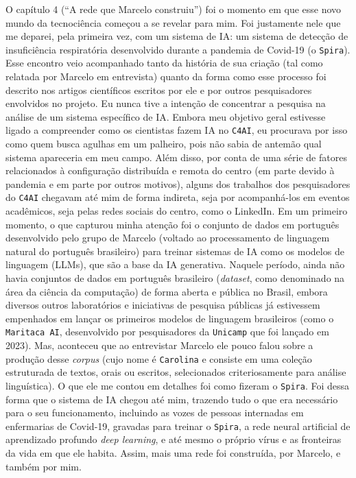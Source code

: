 O capítulo 4 (``A rede que Marcelo construiu'') foi o momento em que esse novo mundo da tecnociência começou a se revelar para mim. Foi justamente nele que me deparei, pela primeira vez, com um sistema de IA: um sistema de detecção de insuficiência respiratória desenvolvido durante a pandemia de Covid-19 (o \texttt{Spira}). Esse encontro veio acompanhado tanto da história de sua criação (tal como relatada por Marcelo em entrevista) quanto da forma como esse processo foi descrito nos artigos científicos escritos por ele e por outros pesquisadores envolvidos no projeto. Eu nunca tive a intenção de concentrar a pesquisa na análise de um sistema específico de IA. Embora meu objetivo geral estivesse ligado a compreender como os cientistas fazem IA no \texttt{C4AI}, eu procurava por isso como quem busca agulhas em um palheiro, pois não sabia de antemão qual sistema apareceria em meu campo. Além disso, por conta de uma série de fatores relacionados à configuração distribuída e remota do centro (em parte devido à pandemia e em parte por outros motivos), alguns dos trabalhos dos pesquisadores do \texttt{C4AI} chegavam até mim de forma indireta, seja por acompanhá-los em eventos acadêmicos, seja pelas redes sociais do centro, como o LinkedIn. Em um primeiro momento, o que capturou minha atenção foi o conjunto de dados em português desenvolvido pelo grupo de Marcelo (voltado ao processamento de linguagem natural do português brasileiro) para treinar sistemas de IA como os modelos de linguagem (LLMs), que são a base da IA generativa. Naquele período, ainda não havia conjuntos de dados em português brasileiro (\textit{dataset}, como denominado na área da ciência da computação) de forma aberta e pública no Brasil, embora diversos outros laboratórios e iniciativas de pesquisa públicas já estivessem empenhados em lançar os primeiros modelos de linguagem brasileiros (como o \texttt{Maritaca AI}, desenvolvido por pesquisadores da \texttt{Unicamp} que foi lançado em 2023). Mas, aconteceu que ao entrevistar Marcelo ele pouco falou sobre a produção desse \textit{corpus} (cujo nome é \texttt{Carolina} e consiste em uma coleção estruturada de textos, orais ou escritos, selecionados criteriosamente para análise linguística). O que ele me contou em detalhes foi como fizeram o \texttt{Spira}. Foi dessa forma que o sistema de IA chegou até mim, trazendo tudo o que era necessário para o seu funcionamento, incluindo as vozes de pessoas internadas em enfermarias de Covid-19, gravadas para treinar o \texttt{Spira}, a rede neural artificial de aprendizado profundo \textit{deep learning}, e até mesmo o próprio vírus e as fronteiras da vida em que ele habita. Assim, mais uma rede foi construída, por Marcelo, e também por mim. 

